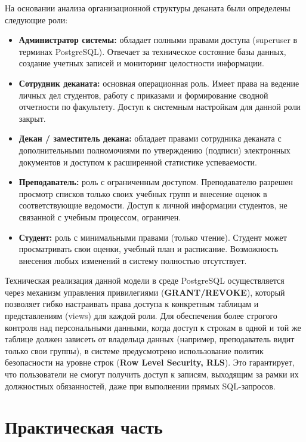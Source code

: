 \documentclass[14pt, a4paper]{extreport}
\begin{document}
На основании анализа организационной структуры деканата были определены следующие роли:
\begin{itemize}
    \item \textbf{Администратор системы:} обладает полными правами доступа (superuser в терминах PostgreSQL). Отвечает за техническое состояние базы данных, создание учетных записей и мониторинг целостности информации.
    \item \textbf{Сотрудник деканата:} основная операционная роль. Имеет права на ведение личных дел студентов, работу с приказами и формирование сводной отчетности по факультету. Доступ к системным настройкам для данной роли закрыт.
    \item \textbf{Декан / заместитель декана:} обладает правами сотрудника деканата с дополнительными полномочиями по утверждению (подписи) электронных документов и доступом к расширенной статистике успеваемости.
    \item \textbf{Преподаватель:} роль с ограниченным доступом. Преподавателю разрешен просмотр списков только своих учебных групп и внесение оценок в соответствующие ведомости. Доступ к личной информации студентов, не связанной с учебным процессом, ограничен.
    \item \textbf{Студент:} роль с минимальными правами (только чтение). Студент может просматривать свои оценки, учебный план и расписание. Возможность внесения любых изменений в систему полностью отсутствует.
\end{itemize}
Техническая реализация данной модели в среде PostgreSQL осуществляется через механизм управления привилегиями (\textbf{GRANT/REVOKE}), который позволяет гибко настраивать права доступа к конкретным таблицам и представлениям (views) для каждой роли. Для обеспечения более строгого контроля над персональными данными, когда доступ к строкам в одной и той же таблице должен зависеть от владельца данных (например, преподаватель видит только свои группы), в системе предусмотрено использование политик безопасности на уровне строк (\textbf{Row Level Security, RLS}). Это гарантирует, что пользователи не смогут получить доступ к записям, выходящим за рамки их должностных обязанностей, даже при выполнении прямых SQL-запросов.

\chapter{Практическая часть}
\end{document}
